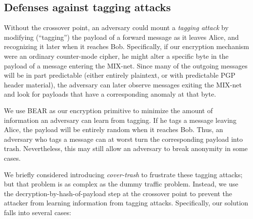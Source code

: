 \documentclass{llncs}
\begin{document}
\subsection{Defenses against tagging attacks}
\label{subsec:tagging}


Without the crossover point, an adversary could mount a \emph{tagging
attack} by modifying (``tagging'') the payload of a forward message as
it leaves Alice, and recognizing it later when it reaches Bob.
Specifically, if our encryption mechanism were an ordinary
counter-mode cipher, he might alter a specific byte in the payload of
a message entering the MIX-net. Since many of the outgoing messages
will be in part predictable (either entirely plaintext, or with
predictable PGP header material), the adversary can later observe
messages exiting the MIX-net and look for payloads that have a
corresponding anomaly at that byte.


We use BEAR as our encryption primitive to minimize the amount of
information an adversary can learn from tagging. If he tags a message
leaving Alice, the payload will be entirely random when it reaches
Bob.  Thus, an adversary who tags a message can at worst turn the
corresponding payload into trash.  
Nevertheless, this may still allow an adversary to
break anonymity in some cases.

We briefly considered introducing \emph{cover-trash} to frustrate
these tagging attacks; but that problem is as complex as the dummy
traffic problem. Instead, we use the decryption-by-hash-of-payload step at the
crossover point to prevent the attacker from learning information from
tagging attacks.  Specifically, our solution falls into several cases:
\end{document}

